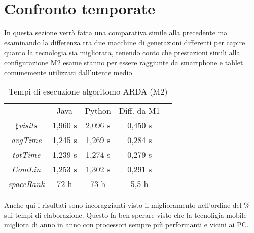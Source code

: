 \section{Confronto temporate}
In questa sezione verr\`a fatta una comparativa simile alla precedente ma esaminando
la differenza tra due macchine di generazioni differenti per capire quanto la tecnologia
sia migliorata, tenendo conto che prestazioni simili alla configurazione M2 esame stanno
per essere raggiunte da smartphone e tablet comunemente utilizzati dall'utente medio.
\begin{table}[]
\centering
\caption{Tempi di esecuzione algoritomo ARDA (M2)}
\label{bcmrk_ARDA}
\begin{tabular}{lllll}
\hline
\multicolumn{1}{|c|}{}                        & \multicolumn{1}{|c|}{Java}       & \multicolumn{1}{|c|}{Python}   & \multicolumn{1}{|c|}{Diff. da M1} \\
\multicolumn{1}{|c|}{$\sharp$\textit{visits}} & \multicolumn{1}{|c|}{ 1,960 s}   & \multicolumn{1}{|c|}{ 2,096 s} & \multicolumn{1}{|c|}{ 0,450 s}  \\
\multicolumn{1}{|c|}{\textit{avgTime}}        & \multicolumn{1}{|c|}{ 1,245 s}   & \multicolumn{1}{|c|}{ 1,269 s} & \multicolumn{1}{|c|}{ 0,284 s}  \\
\multicolumn{1}{|c|}{\textit{totTime}}        & \multicolumn{1}{|c|}{ 1,239 s}   & \multicolumn{1}{|c|}{ 1,274 s} & \multicolumn{1}{|c|}{ 0,279 s}  \\
\multicolumn{1}{|c|}{\textit{ComLin}}         & \multicolumn{1}{|c|}{ 1,253 s}   & \multicolumn{1}{|c|}{ 1,302 s} & \multicolumn{1}{|c|}{ 0,291 s}  \\
\multicolumn{1}{|c|}{\textit{spaceRank}}      & \multicolumn{1}{|c|}{ 72 h}      & \multicolumn{1}{|c|}{ 73 h}    & \multicolumn{1}{|c|}{ 5,5 h}  \\
\hline
\end{tabular}
\end{table}
Anche qui i risultati sono incoraggianti visto il miglioramento nell'ordine del
\% sui tempi di elaborazione. Questo fa ben sperare visto che la tecnoligia mobile
migliora di anno in anno con processori sempre pi\`u performanti e vicini ai PC.
